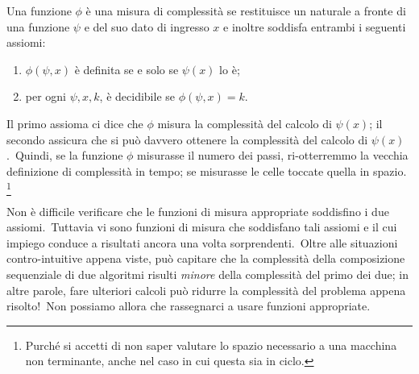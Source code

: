 \begin{definition}
    Una funzione $\phi$ è una misura di complessità se restituisce un naturale a fronte di una funzione $\psi$ e del suo dato di ingresso $x$ e inoltre soddisfa entrambi i seguenti assiomi:
    \begin{enumerate}
        \item $\phi(\psi,x)$ è definita se e solo se $\psi(x)$ lo è;
        \item per ogni $\psi, x, k$, è decidibile se $\phi(\psi,x) = k$.
    \end{enumerate}
\end{definition}

\noindent Il primo assioma ci dice che $\phi$ misura la complessità del calcolo di $\psi(x)$; il secondo assicura che si può davvero ottenere la complessità del calcolo di $\psi(x)$.\
Quindi, se la funzione $\phi$ misurasse il numero dei passi, ri-otterremmo la vecchia definizione di complessità in tempo; se misurasse le celle toccate quella in spazio.
\footnote{Purché si accetti di non saper valutare lo spazio necessario a una macchina non terminante, anche nel caso in cui questa sia in ciclo.}

Non è difficile verificare che le funzioni di misura appropriate soddisfino i due assiomi.\
Tuttavia vi sono funzioni di misura che soddisfano tali assiomi e il cui impiego conduce a risultati ancora una volta sorprendenti.\
Oltre alle situazioni contro-intuitive appena viste, può capitare che la complessità della composizione sequenziale di due algoritmi risulti \textit{minore} della complessità del primo dei due; in altre parole, fare ulteriori calcoli può ridurre la complessità del problema appena risolto!\
Non possiamo allora che rassegnarci a usare funzioni appropriate.\

\newpage

